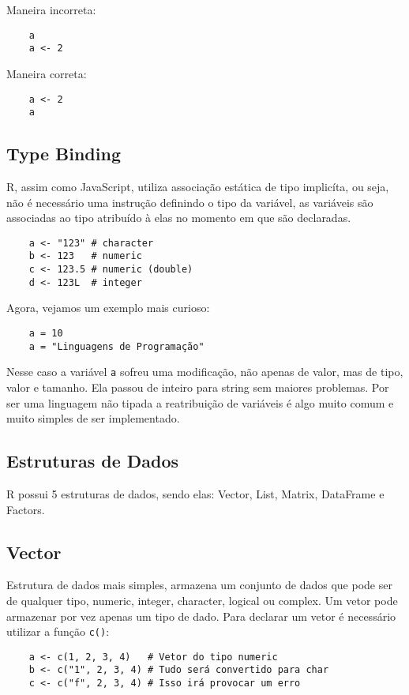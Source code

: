 \documentclass[12pt]{article}
\begin{document}
Maneira incorreta:
\begin{verbatim}
    a
    a <- 2
\end{verbatim}

Maneira correta:
\begin{verbatim}
    a <- 2
    a
\end{verbatim}

\subsection{Type Binding}
    R, assim como JavaScript, utiliza associação estática de tipo implicíta, ou seja, não é necessário uma instrução definindo o tipo da variável, as variáveis são associadas ao tipo atribuído à elas no momento em que são declaradas.

\begin{verbatim}
    a <- "123" # character
    b <- 123   # numeric
    c <- 123.5 # numeric (double)
    d <- 123L  # integer
\end{verbatim}
    Agora, vejamos um exemplo mais curioso:
\begin{verbatim}
    a = 10
    a = "Linguagens de Programação"
\end{verbatim}

Nesse caso a variável \texttt{a} sofreu uma modificação, não apenas de valor, mas de tipo, valor e tamanho. Ela passou de inteiro para string sem maiores problemas. Por ser uma linguagem não tipada a reatribuição de variáveis é algo muito comum e muito simples de ser implementado.

\subsection{Estruturas de Dados}
R possui 5 estruturas de dados, sendo elas: Vector, List, Matrix, DataFrame e Factors.

\subsection{Vector}
Estrutura de dados mais simples, armazena um conjunto de dados que pode ser de qualquer tipo, numeric, integer, character, logical ou complex. Um vetor pode armazenar por vez apenas um tipo de dado.
    Para declarar um vetor é necessário utilizar a função \texttt{c()}:
    
    \begin{verbatim}
    a <- c(1, 2, 3, 4)   # Vetor do tipo numeric
    b <- c("1", 2, 3, 4) # Tudo será convertido para char
    c <- c("f", 2, 3, 4) # Isso irá provocar um erro
    \end{verbatim}
\end{document}
